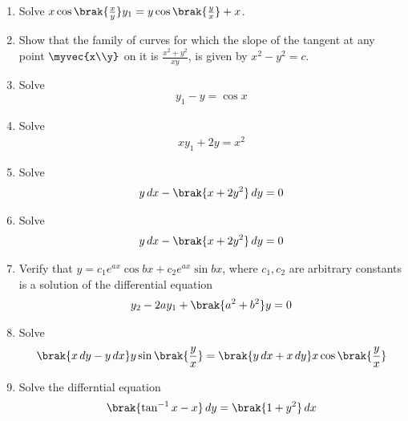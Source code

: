 \begin{enumerate}[label=\arabic*.,ref=\thesubsection.\theenumi]
\item Solve $x \cos\brak{\frac{x}{y}}y_1 = y\cos\brak{\frac{y}{x}}+x$.
\item Show that the family of curves for which the slope of the tangent at any point $\myvec{x\\y}$ on it is $\frac{x^2+y^2}{xy}$, is given by $x^2-y^2 = c$.
%
%
\item Solve 
%
\begin{align}
y_1  - y = \cos x
\end{align}
%
\item Solve 
%
\begin{align}
xy_1  + 2y = x^2
\end{align}
%
\item Solve
%
\begin{align}
y\, dx - \brak{x+2y^2}\, dy = 0
\end{align}
%
\item Solve
%
\begin{align}
y\, dx - \brak{x+2y^2}\, dy = 0
\end{align}
%
\item Verify that $y = c_1e^{ax}\cos bx + c_2 e^{ax}\sin bx$, where $c_1,c_2$ are arbitrary constants is a solution of the differential equation
%
\begin{align}
y_2 - 2ay_1 +\brak{a^2+b^2} y = 0
\end{align}
%
\item Solve
%
\begin{align}
\brak{x\,dy-y\,dx}y\sin\brak{\frac{y}{x}} = \brak{y\, dx + x\, dy}x\cos\brak{\frac{y}{x}}
\end{align}
%
\item Solve the differntial equation
%
\begin{align}
\brak{\tan^{-1}x - x}\, dy = \brak{1+y^2}\, dx
\end{align}

\end{enumerate}
